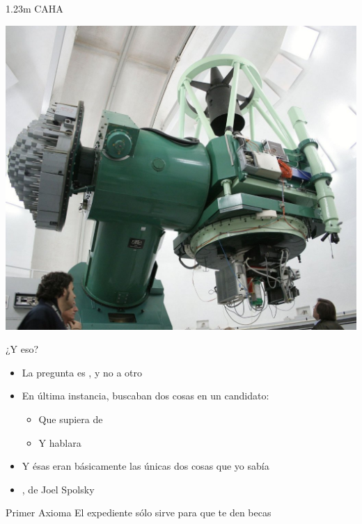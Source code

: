 \documentclass[14pt]{beamer}
\begin{document}
\begin{frame}{1.23m CAHA}
  \begin{center}
    \includegraphics[height=0.8\textheight]{pics/123m_CAHA_2.jpg}
  \end{center}
\end{frame}


\begin{frame}{¿Y eso?}
\begin{itemize}
  \item La pregunta es , y no a otro
  \item En última instancia, buscaban dos cosas en un candidato:
     \begin{itemize}
       \item Que supiera de 
       \item Y hablara 
     \end{itemize}
  \item Y ésas eran básicamente las únicas dos cosas que yo sabía
  \item {}, de Joel Spolsky
\end{itemize}
  \begin{alertblock}{\centering Primer Axioma}
    \centering El expediente sólo sirve para que te den becas
  \end{alertblock}
\end{frame}
\end{document}
